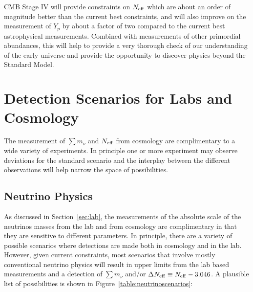 CMB Stage IV will provide constraints on $N_{\rm eff}$ which are about an order of magnitude better than the current best constraints, and will also improve on the measurement of $Y_p$ by about a factor of two compared to the current best astrophysical measurements.  Combined with measurements of other primordial abundances, this will help to provide a very thorough check of our understanding of the early universe and provide the opportunity to discover physics beyond the Standard Model.






\section{Detection Scenarios for Labs and Cosmology}

The measurement of $\sum m_\nu$ and $N_{\rm eff}$ from cosmology are complimentary to a wide variety of experiments.  In principle one or more experiment may observe deviations for the standard scenario and the interplay between the different observations will help narrow the space of possibilities. 

\subsection{Neutrino Physics}

As discussed in Section~\ref{sec:lab}, the measurements of the absolute scale of the neutrinos masses from the lab and from cosmology are complimentary in that they are sensitive to different parameters.  In principle, there are a variety of possible scenarios where detections are made both in cosmology and in the lab.  However, given current constraints, most scenarios that involve mostly conventional neutrino physics will result in upper limits from the lab based measurements and a detection of $\sum m_\nu$ and/or $\Delta N_{\rm eff} \equiv N_{\rm eff} - 3.046$.  A plausible list of possibilities is shown in Figure~\ref{table:neutrinoscenarios}:

